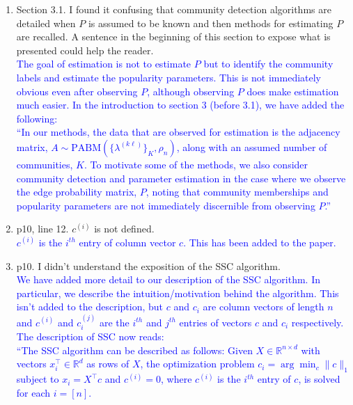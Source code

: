 \documentclass[
]{article}
\begin{document}
\begin{enumerate}
{  The proof of Theorem 1 for arbitrary $K$ should then confirm the intuition based on $K = 2$ and $3$. 
  }
\item
  Section 3.1. I found it confusing that community detection algorithms
  are detailed when \(P\) is assumed to be known and then methods for
  estimating \(P\) are recalled. A sentence in the beginning of this
  section to expose what is presented could help the reader.\\
  \textcolor{blue}{
  The goal of estimation is not to estimate $P$ but to identify the community labels and estimate the popularity parameters. 
  This is not immediately obvious even after observing $P$, although observing $P$ does make estimation much easier. 
  In the introduction to section 3 (before 3.1), we have added the following:
  }\\
  \textcolor{blue}{
  ``In our methods, the data that are observed for estimation is the adjacency matrix, $A \sim \mathrm{PABM}(\{\lambda^{(k \ell)}\}_K, \rho_n)$, along with an assumed number of communities, $K$. 
  To motivate some of the methods, we also consider community detection and parameter estimation in the case where we observe the edge probability matrix, $P$, noting that community memberships and popularity parameters are not immediately discernible from observing $P$.''
  }
\item
  p10, line 12. \(c^{(i)}\) is not defined.\\
  \textcolor{blue}{
  $c^{(i)}$ is the $i^{th}$ entry of column vector $c$. 
  This has been added to the paper.
  }
\item
  p10. I didn't understand the exposition of the SSC algorithm.\\
  \textcolor{blue}{
  We have added more detail to our description of the SSC algorithm. 
  In particular, we describe the intuition/motivation behind the algorithm. 
  This isn't added to the description, but $c$ and $c_i$ are column vectors of length $n$ and $c^{(i)}$ and $c_i^{(j)}$ are the $i^{th}$ and $j^{th}$ entries of vectors $c$ and $c_i$ respectively. 
  }\\
  \textcolor{blue}{The description of SSC now reads:
  }\\
  \textcolor{blue}{
  ``The SSC algorithm can be described as follows: 
  Given \(X \in \mathbb{R}^{n \times d}\) with vectors
  \(x_i^\top \in \mathbb{R}^d\) as rows of \(X\), the optimization problem
  \(c_i = \arg\min_{c} \|c\|_1\) subject to \(x_i = X^\top c\) and
  \(c^{(i)} = 0\), where $c^{(i)}$ is the $i^{th}$ entry of $c$, is solved for each \(i = [n]\). 
}
\end{enumerate}
\end{document}
